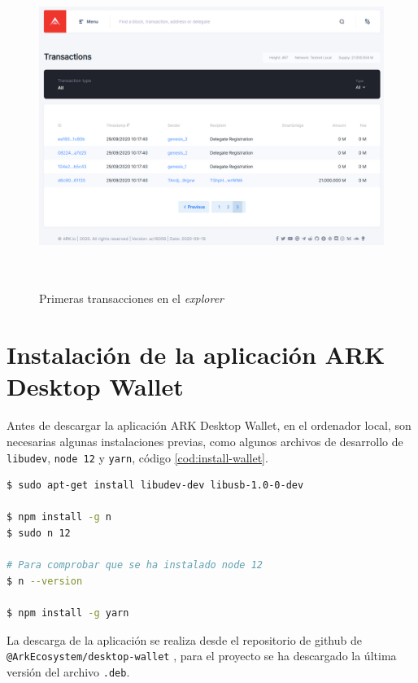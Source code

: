 \begin{figure}[h]
	\centering
	\includegraphics[width=14.5cm,height=10.5cm]{figuras/Navegacion_explorer.png}
	\caption{Primeras transacciones en el \textit{explorer}}
	\label{fig:nav-explorer}
\end{figure}



\section{Instalación de la aplicación ARK Desktop Wallet}

Antes de descargar la aplicación ARK Desktop Wallet, en el ordenador local, son necesarias algunas instalaciones previas, como algunos archivos de desarrollo de \texttt{libudev}, \texttt{node 12} y \texttt{yarn}, código \ref{cod:install-wallet}.

\begin{lstlisting}[language=Bash,caption=Instalaciones previas a la aplicación ARK Wallet, label=cod:install-wallet, style=Consola]
$ sudo apt-get install libudev-dev libusb-1.0-0-dev

$ npm install -g n
$ sudo n 12

# Para comprobar que se ha instalado node 12
$ n --version

$ npm install -g yarn
\end{lstlisting}

La descarga de la aplicación se realiza desde el repositorio de github de \texttt{@ArkEcosystem/desktop-wallet} \cite{descargas-wallet}, para el proyecto se ha descargado la última versión del archivo \texttt{.deb}.

